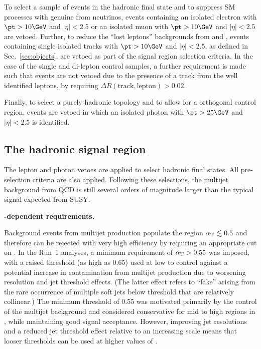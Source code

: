 To select a sample of events in the hadronic final state and to
suppress SM processes with genuine \met from neutrinos, events
containing an isolated electron with $\pt > 10\GeV$ and $|\eta| < 2.5$
or an isolated muon with $\pt > 10\GeV$ and $|\eta| < 2.5$ are
vetoed. Further, to reduce the ``lost leptons'' backgrounds from \wj
and \ttbar, events containing single isolated tracks with $\pt >
10\GeV$ and $|\eta| < 2.5$, as defined in Sec.~\ref{sec:objects},
are vetoed as part of the signal region selection criteria. In the
case of the single and di-lepton control samples, a further
requirement is made such that events are not vetoed due to the
presence of a track from the well identified leptons, by requiring
$\Delta R(\textrm{track},\textrm{lepton}) > 0.02$.

Finally, to select a purely hadronic topology and to allow for a
orthogonal control region, events are vetoed in which an isolated photon
with $\pt > 25\GeV$ and $|\eta| < 2.5$ is identified.

\subsection{The hadronic signal region}
\label{sec:had-signal}

The lepton and photon vetoes are applied to select hadronic final
states. All pre-selection criteria are also applied. Following these
selections, the multijet background from QCD is still several orders
of magnitude larger than the typical signal expected from SUSY.

{\bf \HT-dependent \alphat requirements.}

Background events from multijet production populate the region
$\alpha_{\text{T}} \lesssim 0.5$ and therefore can be rejected with very high
efficiency by requiring an appropriate cut on \alphat. In the Run~1
analyses, a minimum requirement of $\alpha_{\text{T}} > 0.55$ was imposed, with
a raised threshold (as high as 0.65) used at low \HT to control
against a potential increase in contamination from multijet production
due to worsening resolution and jet \PT threshold effects.  (The
latter effect refers to ``fake'' \mht arising from the rare occurrence
of multiple soft jets below threshold that are relatively collinear.)
The minimum threshold of 0.55 was motivated primarily by the control
of the multijet background and considered conservative for mid to high
regions in \HT, while maintaining good signal acceptance. However,
improving jet resolutions and a reduced jet threshold effect relative
to an increasing \HT scale means that looser \alphat thresholds can be
used at higher values of \HT.

